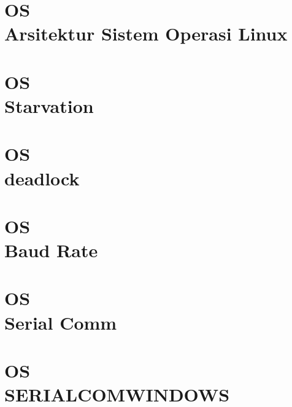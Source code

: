 \documentclass{wileySix}
\begin{document}
\chapter[Linux]
{OS\\ Arsitektur Sistem Operasi Linux}


\chapter[Starvation]
{OS\\ Starvation}


\chapter[DeadLock]
{OS\\ deadlock}



\chapter[Baudrate]
{OS\\ Baud Rate}


%

\chapter[Serial Communication di Linux]
{OS\\ Serial Comm}


\chapter[SERIALCOMWINDOWS]
{OS\\ SERIALCOMWINDOWS}


%

%
\end{document}
